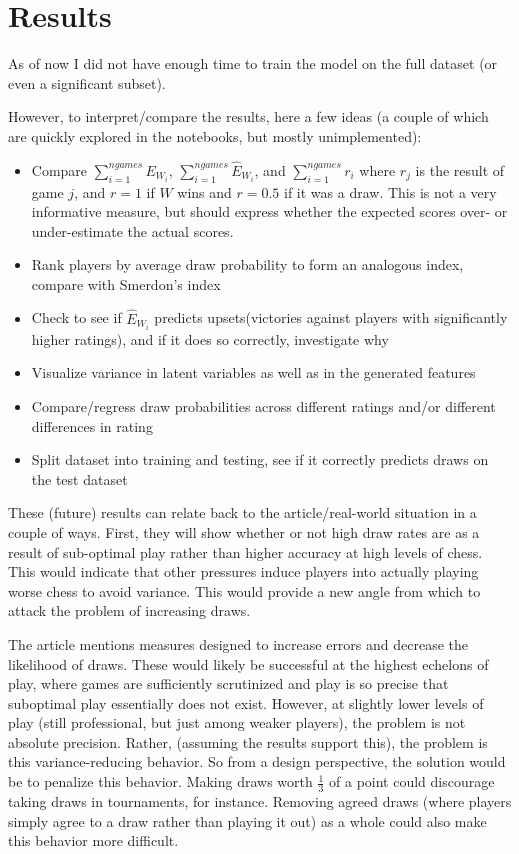 \documentclass{article}
\begin{document}
\section{Results}
As of now I did not have enough time to train the model on the full dataset (or even a significant subset).

However, to interpret/compare the results, here a few ideas (a couple of which are quickly explored in the notebooks, but mostly unimplemented):
\begin{itemize}
    \item Compare $\sum_{i=1}^{ngames}E_{W_i}$,
        $\sum_{i=1}^{ngames}\hat{E}_{W_i}$, and
        $\sum_{i=1}^{ngames}r_i$ where $r_j$ is the result of game $j$, and $r=1$ if $W$ wins and $r=0.5$ if it was a draw.
        This is not a very informative measure, but should express whether the expected scores over- or under-estimate the actual scores.
    \item Rank players by average draw probability to form an analogous index, compare with Smerdon's index
    \item Check to see if $\hat{E}_{W_i}$ predicts upsets(victories against players with significantly higher ratings), and if it does so correctly, investigate why
    \item Visualize variance in latent variables as well as in the generated features
    \item Compare/regress draw probabilities across different ratings and/or different differences in rating
    \item Split dataset into training and testing, see if it correctly predicts draws on the test dataset
\end{itemize}

These (future) results can relate back to the article/real-world situation in a couple of ways.
First, they will show whether or not high draw rates are as a result of sub-optimal play rather than higher accuracy at high levels of chess.
This would indicate that other pressures induce players into actually playing worse chess to avoid variance.
This would provide a new angle from which to attack the problem of increasing draws.

The article mentions measures designed to increase errors and decrease the likelihood of draws.
These would likely be successful at the highest echelons of play, where games are sufficiently
scrutinized and play is so precise that suboptimal play essentially does not exist.
However, at slightly lower levels of play (still professional, but just among weaker players), the problem is not absolute precision.
Rather, (assuming the results support this), the problem is this variance-reducing behavior.
So from a design perspective, the solution would be to penalize this behavior.
Making draws worth $\frac{1}{3}$ of a point could discourage taking draws in tournaments, for instance.
Removing agreed draws (where players simply agree to a draw rather than playing it out) as a whole could also make this behavior more difficult.
\end{document}
